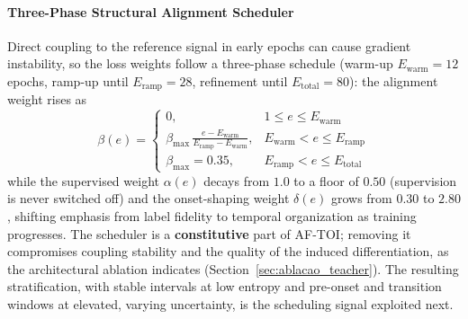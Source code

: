 \documentclass[a4paper,fleqn]{cas-dc}
\newcommand{\AFTOI}{\mbox{AF-TOI}\xspace}
\begin{document}
\paragraph{Three-Phase Structural Alignment Scheduler}
{\color{\revcolor}Direct coupling to the reference signal in early epochs can
cause gradient instability, so the loss weights follow a three-phase schedule
(warm-up $E_{\text{warm}}{=}12$ epochs, ramp-up until
$E_{\text{ramp}}{=}28$, refinement until $E_{\text{total}}{=}80$): the
alignment weight rises as
\begin{equation}
\beta(e)=
\begin{cases}
0, & 1 \leq e \leq E_{\text{warm}} \\[6pt]
\displaystyle\beta_{\max}\,\frac{e - E_{\text{warm}}}{E_{\text{ramp}} -
E_{\text{warm}}}, & E_{\text{warm}} < e \leq E_{\text{ramp}} \\[10pt]
\beta_{\max} = 0.35, & E_{\text{ramp}} < e \leq E_{\text{total}}
\end{cases}
\label{eq:scheduler_aftoi}
\end{equation}
while the supervised weight $\alpha(e)$ decays from $1.0$ to a floor of
$0.50$ (supervision is never switched off) and the onset-shaping weight
$\delta(e)$ grows from $0.30$ to $2.80$, shifting emphasis from label fidelity
to temporal organization as training progresses.}
The scheduler is a \textbf{constitutive} part of \AFTOI; removing it compromises
coupling stability and the quality of the induced differentiation, as the
architectural ablation indicates (Section~\ref{sec:ablacao_teacher}).
The resulting stratification, with stable intervals at low entropy and pre-onset and transition windows at elevated, varying uncertainty, is the scheduling signal exploited next.
\end{document}
